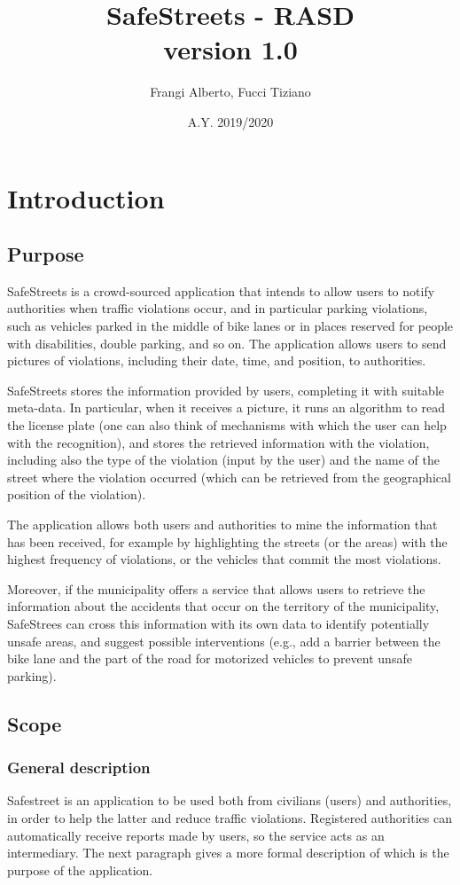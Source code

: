 \documentclass[12pt,a4paper]{report}
\title{SafeStreets - RASD \\ \large version 1.0}
\author{Frangi Alberto, Fucci Tiziano}
\date{A.Y. 2019/2020}
\begin{document}
\maketitle

\tableofcontents
\chapter{Introduction}
	\section{Purpose}
SafeStreets is a crowd-sourced application that intends to allow users to notify authorities when traffic violations occur, and in particular parking violations, such as vehicles parked in the middle of bike lanes or in places reserved for people with disabilities, double parking, and so on. The application allows users to send pictures of violations, including their date, time, and position, to authorities.
 
SafeStreets stores the information provided by users, completing it with suitable meta-data. In particular, when it receives a picture, it runs an algorithm to read the license plate (one can also think of mechanisms with which the user can help with the recognition), and stores the retrieved information with the violation, including also the type of the violation (input by the user) and the name of the street where the violation occurred (which can be retrieved from the geographical position of the violation). 

The application allows both users and authorities to mine the information that has been received, for example by highlighting the streets (or the areas) with the highest frequency of violations, or the vehicles that commit the most violations. 

Moreover, if the municipality offers a service that allows users to retrieve the information about the accidents that occur on the territory of the municipality, SafeStrees can cross this information with its own data to identify potentially unsafe areas, and suggest possible interventions (e.g., add a barrier between the bike lane and the part of the road for motorized vehicles to prevent unsafe parking).


	\section{Scope}
	\subsection{General description}
Safestreet is an application to be used both from civilians (users) and authorities, in order to help the latter and reduce traffic violations. Registered authorities can automatically receive reports made by users, so the service acts as an intermediary. The next paragraph gives a more formal description of which is the purpose of the application.
\end{document}
